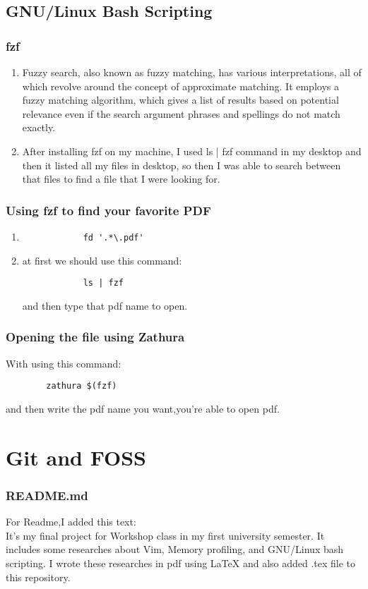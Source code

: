 \documentclass[titlepage]{article}
\begin{document}
	\subsection{GNU/Linux Bash Scripting}
	\subsubsection{fzf}
	\begin{enumerate}
		\item Fuzzy search, also known as fuzzy matching, has various interpretations, all of which revolve around the concept of approximate matching. It employs a fuzzy matching algorithm, which gives a list of results based on potential relevance even if the search argument phrases and spellings do not match exactly.
		\item After installing fzf on my machine, I used ls | fzf command in my desktop and then it listed all my files in desktop, so then I was able to search between that files to find a file that I were looking for.
	\end{enumerate}
	\subsubsection{ Using fzf to find your favorite PDF}
	\begin{enumerate}
		\item \begin{lstlisting}
			fd '.*\.pdf'
		\end{lstlisting}
		\item at first we should use this command:
		\begin{lstlisting}
			ls | fzf
		\end{lstlisting}
		and then type that pdf name to open.
	\end{enumerate}
	\subsubsection{Opening the file using Zathura}
	With using this command:
	\begin{lstlisting}
		zathura $(fzf)
	\end{lstlisting}
	and then write the pdf name you want,you're able to open pdf.
	\section{Git and FOSS}
	\subsubsection{README.md}
	For Readme,I added this text:\\It's my final project for Workshop class in my first university semester. It includes some researches about Vim, Memory profiling, and GNU/Linux bash scripting. I wrote these researches in pdf using LaTeX and also added .tex file to this repository.
	
	
\end{document}
